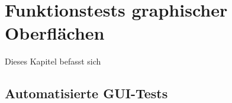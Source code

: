 \chapter{Funktionstests graphischer Oberflächen}\label{chapter:introguitesting}


Dieses Kapitel befasst sich 


\section{Automatisierte GUI-Tests}\label{section:automatedguitesting}


